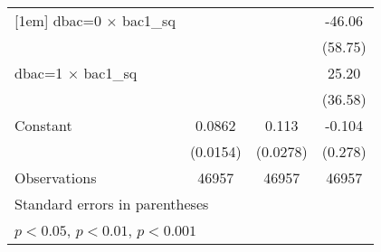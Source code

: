 \begin{table}[htbp]
\begin{tabular}{l*{3}{c}}
[1em]
dbac=0 $\times$ bac1\_sq&                     &                     &      -46.06         \\
                    &                     &                     &     (58.75)         \\
[1em]
dbac=1 $\times$ bac1\_sq&                     &                     &       25.20         \\
                    &                     &                     &     (36.58)         \\
[1em]
Constant            &      0.0862\sym{***}&       0.113\sym{***}&      -0.104         \\
                    &    (0.0154)         &    (0.0278)         &     (0.278)         \\
\hline
Observations        &       46957         &       46957         &       46957         \\
\hline\hline
\multicolumn{4}{l}{\footnotesize Standard errors in parentheses}\\
\multicolumn{4}{l}{\footnotesize \sym{*} \(p<0.05\), \sym{**} \(p<0.01\), \sym{***} \(p<0.001\)}\\
\end{tabular}
\end{table}
